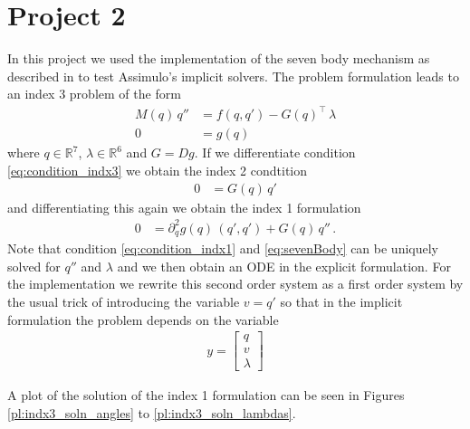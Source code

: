 \documentclass{report}
\def\R{\mathbb{R}}
\newcommand{\vect}[1]{\begin{bmatrix} #1 \end{bmatrix}}
\begin{document}
\chapter*{Project 2}

In this project we used the implementation of the seven body mechanism as described in \cite{HW_SolvingODEs} to test Assimulo's implicit solvers. The problem formulation leads to an index 3 problem of the form
\begin{align}
	M(q)\,q''&= f(q,q')-G(q)^\top\,\lambda\label{eq:sevenBody} \\
	0 &= g(q) \label{eq:condition_indx3}
\end{align}
where $q\in\R^7$, $\lambda\in\R^6$ and $G=Dg$. If we differentiate condition \eqref{eq:condition_indx3} we obtain the index 2 condtition
\begin{align*}
	0&=G(q)\,q'
\end{align*}
and differentiating this again we obtain the index 1 formulation
\begin{align*}
	0&= \partial_q^2g(q)\,(q',q')+G(q)\,q''\,.  \label{eq:condition_indx1}
\end{align*}
Note that condition \eqref{eq:condition_indx1} and \eqref{eq:sevenBody} can be uniquely solved for $q''$ and $\lambda$ and we then obtain an ODE in the explicit formulation.
For the implementation we rewrite this second order system as a first order system by the usual trick of introducing the variable $v=q'$ so that in the implicit formulation the problem depends on the variable
\begin{align*}
	y = \vect{q \\ v \\ \lambda}
\end{align*}

A plot of the solution of the index 1 formulation can be seen in Figures \ref{pl:indx3_soln_angles} to \ref{pl:indx3_soln_lambdas}.
\end{document}

